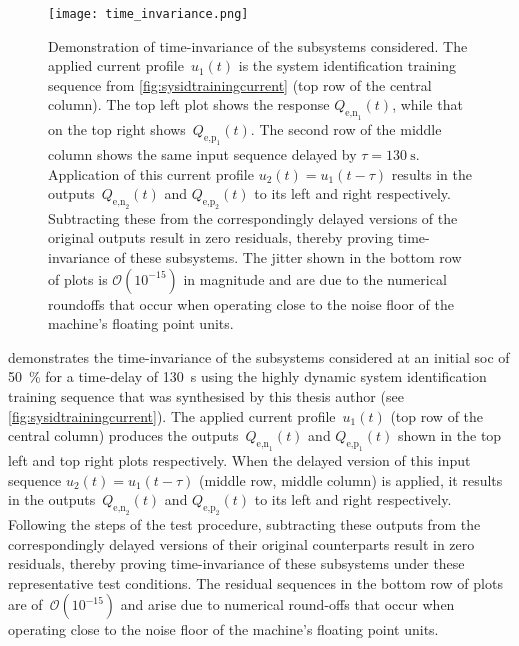 \begin{figure}[!htb]
    \centering
    \texttt{[image: time\_invariance.png]}
    \caption[Demonstration of time-invariance of~$Q_\text{e,n}(t)$ and
    $Q_\text{e,p}(t)$ subsystems]{Demonstration of time-invariance of the
        subsystems considered. The applied current profile~$u_1(t)$ is the
        system identification training sequence
        from \cref{fig:sysidtrainingcurrent} (top row of the central column).
        The top left plot shows the response $Q_{\text{e,n}_1}\!(t)$, while that
        on the top right shows~$Q_{\text{e,p}_1}\!(t)$. The second row of the
        middle column shows the same input sequence delayed by ${\tau =
        \SI{130}{\second}}$. Application of this current profile $u_2(t) =
        u_1(t-\tau)$ results in the outputs~$Q_{\text{e,n}_2}\!(t)$ and
        $Q_{\text{e,p}_2}\!(t)$ to its left and right respectively. Subtracting
        these from the correspondingly delayed versions of the original outputs
        result in zero residuals, thereby proving time-invariance of these
        subsystems. The jitter shown in the bottom row of plots is
        $\mathcal{O}(10^{-15})$ in magnitude and are due to the numerical
        roundoffs that occur when operating close to the noise floor of the
    machine's floating point units.}%
\label{fig:timeinvariance}
\end{figure}

\addlines[0.5]
  demonstrates the  time-invariance  of the  subsystems
considered  at  an  initial  \gls{soc} of  \SI{50}{\percent}  for  a  time-delay
of   \SI{130}{\second}   using   the  highly   dynamic   system   identification
training    sequence   that    was   synthesised    by   this    thesis   author
(see \cref{fig:sysidtrainingcurrent}).  The  applied  current  profile~$u_1(t)$
(top row  of the  central column)  produces the  outputs~$Q_{\text{e,n}_1}\!(t)$
and  $Q_{\text{e,p}_1}\!(t)$  shown  in  the   top  left  and  top  right  plots
respectively.  When  the delayed  version  of  this  input sequence  ${u_2(t)  =
u_1(t-\tau)}$ (middle row, middle column) is  applied, it results in the
outputs~$Q_{\text{e,n}_2}\!(t)$  and  $Q_{\text{e,p}_2}\!(t)$  to  its  left
and  right respectively.  Following the  steps  of the  test  procedure,
subtracting  these outputs from the correspondingly delayed versions of their
original counterparts result in  zero residuals, thereby  proving
time-invariance of  these subsystems under these representative test conditions.
The residual sequences in the bottom row of plots are of~$\mathcal{O}(10^{-15})$
and arise due to numerical round-offs that occur  when operating close  to the
noise  floor of the  machine's floating point units.

